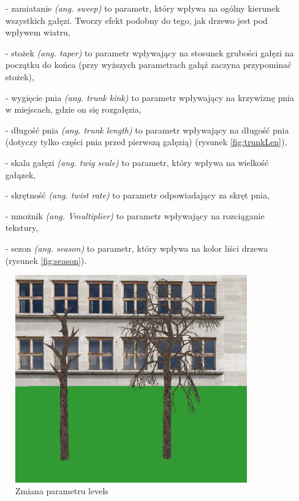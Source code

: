 \documentclass[a4paper,twoside,12pt]{report}
\begin{document}
\begin{itemize}
	\item[-] zamiatanie \textit{(ang. sweep)} to parametr, który wpływa na ogólny kierunek wszystkich gałęzi. Tworzy efekt podobny do tego, jak drzewo jest pod wpływem wiatru,
	\item[-] stożek \textit{(ang. taper)} to parametr wpływający na stosunek grubości gałęzi na początku do końca (przy wyższych parametrach gałąź zaczyna przypominać stożek),
	\item[-] wygięcie pnia \textit{(ang. trunk kink)} to parametr wpływający na krzywiznę pnia w miejscach, gdzie on się rozgałęzia,
	\item[-] długość pnia \textit{(ang. trunk length)} to parametr wpływający na długość pnia (dotyczy tylko części pnia przed pierwszą gałęzią) (rysunek \ref{fig:trunkLen}),
	\item[-] skala gałęzi \textit{(ang. twig scale)} to parametr, który wpływa na wielkość gałązek,
	\item[-] skrętność \textit{(ang. twist rate)} to parametr odpowiadający za skręt pnia,
	\item[-] mnożnik \textit{(ang. Vmultiplier)} to parametr wpływający na rozciąganie tekstury,
	\item[-] sezon \textit{(ang. season)} to parametr, który wpływa na kolor liści drzewa (rysunek \ref{fig:season}).
\end{itemize}


\begin{figure}[H]
	\centering\includegraphics[width=10cm]{grafika/params/Levels.png}
	\caption{Zmiana parametru levels}
    \label{fig:levels}
\end{figure}
\end{document}
